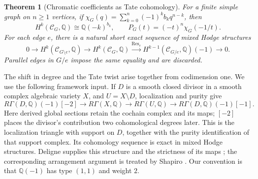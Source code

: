 \documentclass[11pt]{article}
\newtheorem{theorem}{Theorem}[section]
\theoremstyle{definition}
\theoremstyle{remark}
\newcommand{\Q}{\mathbb Q}
\begin{document}
\begin{theorem}[Chromatic coefficients as Tate cohomology]
\label{thm:dag-chromatic-tate}
For a finite simple graph on $n\ge1$ vertices, if
$\chi_G(q)=\sum_{k=0}^n(-1)^k b_kq^{n-k}$, then
\[
 H^k(\mathcal C_G,\Q)\cong\Q(-k)^{b_k},\qquad
 P_G(t)=(-t)^n\chi_G(-1/t).
\]
For each edge $e$, there is a natural short exact sequence of mixed Hodge
structures
\begin{equation}\label{eq:dag-deletion-restriction}
 0\longrightarrow H^k(\mathcal C_{G\setminus e},\Q)
 \longrightarrow H^k(\mathcal C_G,\Q)
 \xrightarrow{\operatorname{Res}_e}
 H^{k-1}(\mathcal C_{G/e},\Q)(-1)\longrightarrow0.
\end{equation}
Parallel edges in $G/e$ impose the same equality and are discarded.
\end{theorem}

The shift in degree and the Tate twist arise together from codimension one.
We use the following framework input. If $D$ is a smooth closed divisor in
a smooth complex algebraic variety $X$, and $U=X\setminus D$, localization
and purity give
\begin{equation}\label{eq:dag-gysin-realization}
 R\Gamma(D,\Q)(-1)[-2]\longrightarrow R\Gamma(X,\Q)
 \longrightarrow R\Gamma(U,\Q)
 \longrightarrow R\Gamma(D,\Q)(-1)[-1].
\end{equation}
Here derived global sections retain the cochain complex and its maps;
$[-2]$ places the divisor's contribution two cohomological degrees later.
This is the localization triangle with support on $D$, together with the
purity identification of that support complex. Its cohomology sequence is
exact in mixed Hodge structures. Deligne supplies this structure and the
strictness of its maps \cite[\S2.3, \S3]{dagDeligneHodgeII}; the corresponding
arrangement argument is treated by Shapiro \cite{dagShapiro1993}.
Our convention is that $\Q(-1)$ has type $(1,1)$ and weight $2$.
\end{document}
